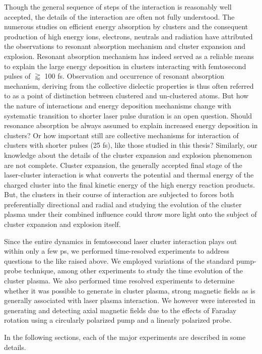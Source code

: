 \documentclass[a4paper,12pt]{article}
\begin{document}
Though the general sequence of steps of the interaction is reasonably well accepted, the details of the interaction are often not fully understood. The numerous studies on efficient energy absorption by clusters and the consequent production of high energy ions, electrons, neutrals and radiation have attributed the observations to resonant absorption mechanism and cluster expansion and explosion. Resonant absorption mechanism has indeed served as a reliable means to explain the large energy deposition in clusters interacting with femtosecond pulses of $\gtrapprox$ 100 fs\cite{explosionditmire}. Observation and occurrence of resonant absorption mechanism, deriving from the collective dielectic properties is thus often referred to as a point of distinction between clustered and un-clustered atoms. But how the nature of interactions and energy deposition mechanisms change with systematic transition to shorter laser pulse duration is an open question. Should resonance absorption be always assumed to explain increased energy deposition in clusters? Or how important still are collective mechanisms for interaction of clusters with shorter pulses (25 fs), like those studied in this thesis? Similarly, our knowledge about the details of the cluster expansion and explosion phenomenon are not complete. Cluster expansion, the generally accepted final stage of the laser-cluster interaction is what converts the potential and thermal energy of the charged cluster into the final kinetic energy of the high energy reaction products. But, the clusters in their course of interaction are subjected to forces both preferentially directional and radial and studying the evolution of the cluster plasma under their combined influence could throw more light onto the subject of cluster expansion and explosion itself. 

Since the entire dynamics in femtosecond laser cluster interaction plays out within only a few ps, we performed time-resolved experiments to address questions to the like raised above. We employed variations of the standard pump-probe technique, among other experiments to study the time evolution of the cluster plasma.
We also performed time resolved experiments to determine whether it was possible to generate in cluster plasma, strong magnetic fields as is generally associated with laser plasma interaction. We however were interested in generating and detecting axial magnetic fields due to the effects of Faraday rotation using a circularly polarized pump and a linearly polarized probe. 

In the following sections, each of the major experiments are described in some details. 
\end{document}
